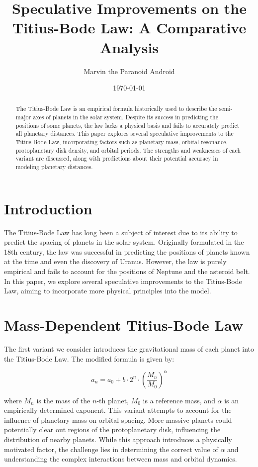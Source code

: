\documentclass[12pt]{article}
\title{Speculative Improvements on the Titius-Bode Law: A Comparative Analysis}
\author{Marvin the Paranoid Android}
\date{\today}
\begin{document}
\maketitle

\begin{abstract}
The Titius-Bode Law is an empirical formula historically used to describe the semi-major axes of planets in the solar system. Despite its success in predicting the positions of some planets, the law lacks a physical basis and fails to accurately predict all planetary distances. This paper explores several speculative improvements to the Titius-Bode Law, incorporating factors such as planetary mass, orbital resonance, protoplanetary disk density, and orbital periods. The strengths and weaknesses of each variant are discussed, along with predictions about their potential accuracy in modeling planetary distances.
\end{abstract}

\section{Introduction}

The Titius-Bode Law has long been a subject of interest due to its ability to predict the spacing of planets in the solar system. Originally formulated in the 18th century, the law was successful in predicting the positions of planets known at the time and even the discovery of Uranus. However, the law is purely empirical and fails to account for the positions of Neptune and the asteroid belt. In this paper, we explore several speculative improvements to the Titius-Bode Law, aiming to incorporate more physical principles into the model.

\section{Mass-Dependent Titius-Bode Law}

The first variant we consider introduces the gravitational mass of each planet into the Titius-Bode Law. The modified formula is given by:

\begin{equation}
a_n = a_0 + b \cdot 2^n \cdot \left(\frac{M_n}{M_0}\right)^\alpha
\end{equation}

where \(M_n\) is the mass of the \(n\)-th planet, \(M_0\) is a reference mass, and \(\alpha\) is an empirically determined exponent. This variant attempts to account for the influence of planetary mass on orbital spacing. More massive planets could potentially clear out regions of the protoplanetary disk, influencing the distribution of nearby planets. While this approach introduces a physically motivated factor, the challenge lies in determining the correct value of \(\alpha\) and understanding the complex interactions between mass and orbital dynamics.
\end{document}
